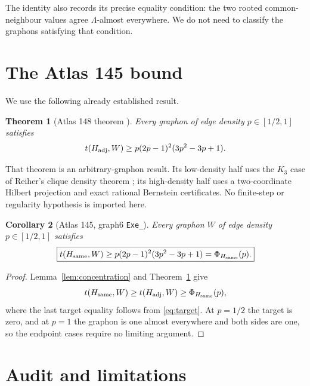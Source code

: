 \documentclass[11pt]{article}
\newtheorem{theorem}{Theorem}[section]
\newtheorem{corollary}[theorem]{Corollary}
\begin{document}
The identity also records its precise equality condition: the two rooted
common-neighbour values agree $\Lambda$-almost everywhere.  We do not need to
classify the graphons satisfying that condition.


\section{The Atlas 145 bound}

We use the following already established result.

\begin{theorem}[Atlas 148 theorem \cite{Atlas148}]
\label{thm:atlas148}
Every graphon of edge density $p\in[1/2,1]$ satisfies
\[
 t(H_{\rm adj},W)
 \geq p(2p-1)^2(3p^2-3p+1).
\]
\end{theorem}

That theorem is an arbitrary-graphon result.  Its low-density half uses the
$K_3$ case of Reiher's clique density theorem \cite{ReiherCliqueDensity}; its
high-density half uses a two-coordinate Hilbert projection and exact rational
Bernstein certificates.  No finite-step or regularity hypothesis is imported
here.

\begin{corollary}[Atlas 145, graph6 \texttt{Exe\_}]
Every graphon $W$ of edge density $p\in[1/2,1]$ satisfies
\[
 \boxed{
 t(H_{\rm same},W)
 \geq p(2p-1)^2(3p^2-3p+1)
 =\Phi_{H_{\rm same}}(p).
 }
\]
\end{corollary}

\begin{proof}
Lemma~\ref{lem:concentration} and Theorem~\ref{thm:atlas148} give
\[
 t(H_{\rm same},W)\geq t(H_{\rm adj},W)
 \geq\Phi_{H_{\rm same}}(p),
\]
where the last target equality follows from \eqref{eq:target}.  At $p=1/2$
the target is zero, and at $p=1$ the graphon is one almost everywhere and
both sides are one, so the endpoint cases require no limiting argument.
\end{proof}


\section{Audit and limitations}
\end{document}
